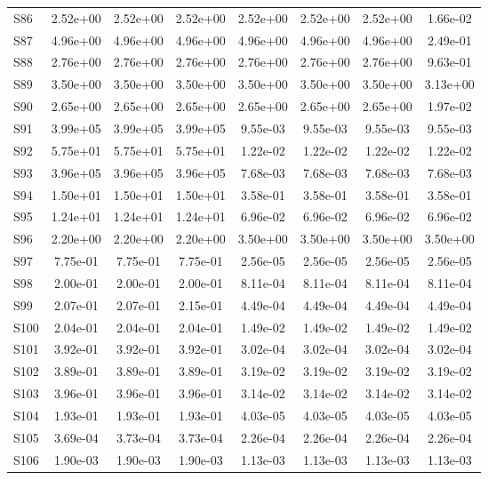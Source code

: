 {\begin{longtable}{l S[table-format=1.2e+2] S[table-format=1.2e+2] S[table-format=1.2e+2] S[table-format=1.2e+2] S[table-format=1.2e+2] S[table-format=1.2e+2] S[table-format=1.2e+2]}
S86 & 2.52e+00 & 2.52e+00 & 2.52e+00 & 2.52e+00 & 2.52e+00 & 2.52e+00 & 1.66e-02 \\
S87 & 4.96e+00 & 4.96e+00 & 4.96e+00 & 4.96e+00 & 4.96e+00 & 4.96e+00 & 2.49e-01 \\
S88 & 2.76e+00 & 2.76e+00 & 2.76e+00 & 2.76e+00 & 2.76e+00 & 2.76e+00 & 9.63e-01 \\
S89 & 3.50e+00 & 3.50e+00 & 3.50e+00 & 3.50e+00 & 3.50e+00 & 3.50e+00 & 3.13e+00 \\
S90 & 2.65e+00 & 2.65e+00 & 2.65e+00 & 2.65e+00 & 2.65e+00 & 2.65e+00 & 1.97e-02 \\
S91 & 3.99e+05 & 3.99e+05 & 3.99e+05 & 9.55e-03 & 9.55e-03 & 9.55e-03 & 9.55e-03 \\
S92 & 5.75e+01 & 5.75e+01 & 5.75e+01 & 1.22e-02 & 1.22e-02 & 1.22e-02 & 1.22e-02 \\
S93 & 3.96e+05 & 3.96e+05 & 3.96e+05 & 7.68e-03 & 7.68e-03 & 7.68e-03 & 7.68e-03 \\
S94 & 1.50e+01 & 1.50e+01 & 1.50e+01 & 3.58e-01 & 3.58e-01 & 3.58e-01 & 3.58e-01 \\
S95 & 1.24e+01 & 1.24e+01 & 1.24e+01 & 6.96e-02 & 6.96e-02 & 6.96e-02 & 6.96e-02 \\
S96 & 2.20e+00 & 2.20e+00 & 2.20e+00 & 3.50e+00 & 3.50e+00 & 3.50e+00 & 3.50e+00 \\
S97 & 7.75e-01 & 7.75e-01 & 7.75e-01 & 2.56e-05 & 2.56e-05 & 2.56e-05 & 2.56e-05 \\
S98 & 2.00e-01 & 2.00e-01 & 2.00e-01 & 8.11e-04 & 8.11e-04 & 8.11e-04 & 8.11e-04 \\
S99 & 2.07e-01 & 2.07e-01 & 2.15e-01 & 4.49e-04 & 4.49e-04 & 4.49e-04 & 4.49e-04 \\
S100 & 2.04e-01 & 2.04e-01 & 2.04e-01 & 1.49e-02 & 1.49e-02 & 1.49e-02 & 1.49e-02 \\
S101 & 3.92e-01 & 3.92e-01 & 3.92e-01 & 3.02e-04 & 3.02e-04 & 3.02e-04 & 3.02e-04 \\
S102 & 3.89e-01 & 3.89e-01 & 3.89e-01 & 3.19e-02 & 3.19e-02 & 3.19e-02 & 3.19e-02 \\
S103 & 3.96e-01 & 3.96e-01 & 3.96e-01 & 3.14e-02 & 3.14e-02 & 3.14e-02 & 3.14e-02 \\
S104 & 1.93e-01 & 1.93e-01 & 1.93e-01 & 4.03e-05 & 4.03e-05 & 4.03e-05 & 4.03e-05 \\
S105 & 3.69e-04 & 3.73e-04 & 3.73e-04 & 2.26e-04 & 2.26e-04 & 2.26e-04 & 2.26e-04 \\
S106 & 1.90e-03 & 1.90e-03 & 1.90e-03 & 1.13e-03 & 1.13e-03 & 1.13e-03 & 1.13e-03 \\

\end{longtable}}
